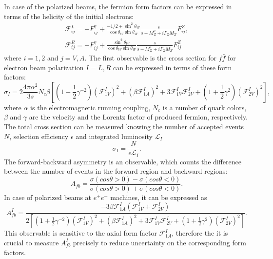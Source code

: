 In case of the polarized beams, the fermion form factors can be expressed in terms of the helicity of the initial electrons:
\begin{eqnarray}
	\mathcal{F}^L_{ij} = - F^\gamma_{ij} +  \frac{-1/2 + \sin^2\theta_W}{\cos\theta_W\sin\theta_W}\frac{s}{s-M^2_Z+i\Gamma_ZM_Z}F^Z_{ij},\\
    \mathcal{F}^R_{ij} = - F^\gamma_{ij} +  \frac{\sin^2\theta_W}{\cos\theta_W\sin\theta_W}\frac{s}{s-M^2_Z+i\Gamma_ZM_Z}F^Z_{ij}    
\end{eqnarray}
where $i=1,2$ and $j=V,A$.
The first observable is the cross section for $f\bar{f}$ for electron beam polarization $I=L,R$ can be expressed in terms of these form factors:
\begin{equation}
	\sigma_I = 2\frac{4\pi\alpha^2}{3s}N_c\beta[(1+\frac{1}{2}\gamma^{-2})(\mathcal{F}^I_{1V})^2 + (\beta\mathcal{F}^I_{1A})^2+3\mathcal{F}^I_{1V}\mathcal{F}^I_{2V}+(1+\frac{1}{2}\gamma^{2})(\mathcal{F}^I_{2V})^2],
\end{equation}
where $\alpha$ is the electromagnetic running coupling, $N_c$ is a number of quark colors, $\beta$ and $\gamma$ are the velocity and the Lorentz factor of produced fermion, respectively. 
The total cross section can be measured knowing the number of accepted events $N$, selection efficiency $\epsilon$ and integrated luminosity $\mathcal{L}_I$
\begin{equation}
	\sigma_I = \frac{N}{\epsilon \mathcal{L}_I}.
    \label{formula:Xsection_3}
\end{equation}
The forward-backward asymmetry is an observable, which counts the difference between the number of events in the forward region and backward regions:
\begin{equation}
	A_{fb} = \frac{\sigma(cos\theta > 0) - \sigma(cos\theta < 0)}{\sigma(cos\theta > 0) + \sigma(cos\theta < 0)}.
\end{equation}
In case of polarized beams at $e^+e^-$ machines, it can be expressed as
\begin{equation}
	A_{fb}^I = \frac{-3\beta\mathcal{F}^I_{1A}(\mathcal{F}^I_{1V} + \mathcal{F}^I_{2V})}{2[(1+\frac{1}{2}\gamma^{-2})(\mathcal{F}^I_{1V})^2 + (\beta\mathcal{F}^I_{1A})^2+3\mathcal{F}^I_{1V}\mathcal{F}^I_{2V}+(1+\frac{1}{2}\gamma^{2})(\mathcal{F}^I_{2V})^2]}.
    \label{formula:AfbForm_3}
\end{equation}
This observable is sensitive to the axial form factor $\mathcal{F}^I_{1A}$, therefore the it is crucial to measure $A_{fb}^I$ precisely to reduce uncertainty on the corresponding form factors.

